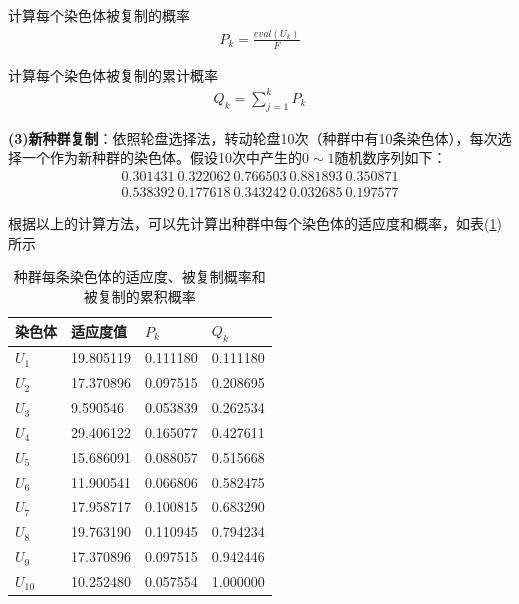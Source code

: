             \par
            计算每个染色体被复制的概率
            \begin{align*}
            P_k = \frac{eval(U_k)}{F}
            \end{align*}
            \par
            计算每个染色体被复制的累计概率
            \begin{align*}
            Q_k = \sum_{j=1}^k P_k
            \end{align*}
            \par
            \textbf{(3)新种群复制}：依照轮盘选择法，转动轮盘10次（种群中有10条染色体），每次选择一个作为新种群的染色体。假设10次中产生的$0\sim 1$随机数序列如下：
            \begin{align*}
            0.301431\ 0.322062 \ 0.766503 \ 0.881893 \ 0.350871 \\
            0.538392 \ 0.177618 \ 0.343242 \ 0.032685 \ 0.197577
            \end{align*}
            \par
            根据以上的计算方法，可以先计算出种群中每个染色体的适应度和概率，如表(\ref{种群每条染色体的适应度、被复制概率和被复制的累积概率})所示
            \begin{table}[H]
            \caption{种群每条染色体的适应度、被复制概率和被复制的累积概率}
            \label{种群每条染色体的适应度、被复制概率和被复制的累积概率}
            \begin{tabularx}{\textwidth}{|Y|Y|Y|Y|}
            \hline
            染色体 & 适应度值 & $P_k$ & $Q_k$ \\\hline
            $U_1$ & 19.805119 & 0.111180 & 0.111180\\\hline
            $U_2$ & 17.370896 & 0.097515 & 0.208695\\\hline
            $U_3$ & 9.590546 & 0.053839 & 0.262534\\\hline
            $U_4$ & 29.406122 & 0.165077 & 0.427611\\\hline
            $U_5$ & 15.686091 & 0.088057 & 0.515668\\\hline
            $U_6$ & 11.900541 & 0.066806 & 0.582475\\\hline
            $U_7$ & 17.958717 & 0.100815 & 0.683290\\\hline
            $U_8$ & 19.763190 & 0.110945 & 0.794234\\\hline
            $U_9$ & 17.370896 & 0.097515 & 0.942446\\\hline
            $U_{10}$ & 10.252480 & 0.057554 & 1.000000\\\hline
            \end{tabularx}
            \end{table}
